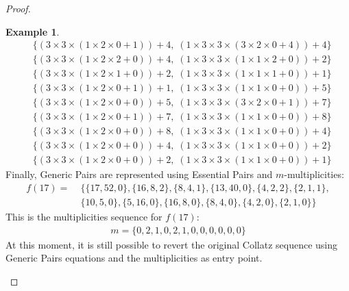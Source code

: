 \documentclass{jams-l}
\theoremstyle{definition}
\newtheorem{example}[theorem]{Example}
\theoremstyle{remark}
\numberwithin{equation}{section}
\begin{document}
\begin{proof}
\begin{example}
\begin{align}
    				&\{{(3\times3\times(1\times2\times0+1))+4,\;(1\times3\times3\times(3\times2\times0+4))+4}\}\\
    				&\{{(3\times3\times(1\times2\times2+0))+4,\;(1\times3\times3\times(1\times1\times2+0))+2}\}\\
    				&\{{(3\times3\times(1\times2\times1+0))+2,\;(1\times3\times3\times(1\times1\times1+0))+1}\}\\
    				&\{{(3\times3\times(1\times2\times0+1))+1,\;(1\times3\times3\times(1\times1\times0+0))+5}\}\\
    				&\{{(3\times3\times(1\times2\times0+0))+5,\;(1\times3\times3\times(3\times2\times0+1))+7}\}\\
    				&\{{(3\times3\times(1\times2\times0+1))+7,\;(1\times3\times3\times(1\times1\times0+0))+8}\}\\
    				&\{{(3\times3\times(1\times2\times0+0))+8,\;(1\times3\times3\times(1\times1\times0+0))+4}\}\\
    				&\{{(3\times3\times(1\times2\times0+0))+4,\;(1\times3\times3\times(1\times1\times0+0))+2}\}
    			\end{align}
       			\begin{align}
                   	&\{{(3\times3\times(1\times2\times0+0))+2,\;(1\times3\times3\times(1\times1\times0+0))+1}\}
        		\end{align}
    			Finally, Generic Pairs are represented using Essential Pairs and $m$-multiplicities:
    			\begin{align}
    				f(17)= &\;\{\{17,52,0\},\{16,8,2\},\{8,4,1\},\{13,40,0\},\{4,2,2\},\{2,1,1\},\\
    				\nonumber &\;\{10,5,0\},\{5,16,0\},\{16,8,0\},\{8,4,0\},\{4,2,0\},\{2,1,0\}\}
    			\end{align}
                This is the multiplicities sequence for $f(17)$:
    			\begin{align}
    				m= \{0, 2, 1, 0, 2, 1, 0, 0, 0, 0, 0, 0\}
    			\end{align}
            At this moment, it is still possible to revert the original Collatz sequence using Generic Pairs equations and the multiplicities as entry point.
    		\end{example}
    	\end{proof}
\end{document}
